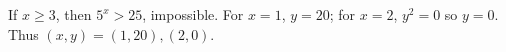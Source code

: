 If $x\ge3$, then $5^x>25$, impossible. For $x=1$, $y=20$; for $x=2$, $y^2=0$ so $y=0$. Thus $\boxed{(x,y)=(1,20),(2,0)}$.
